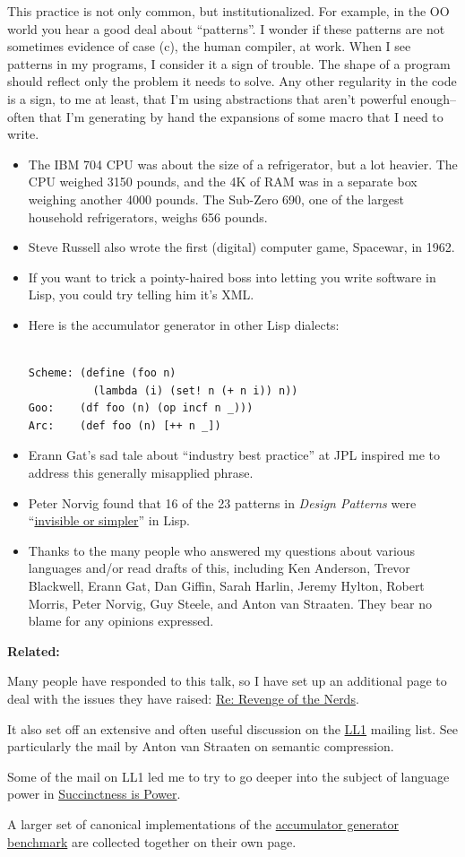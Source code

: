 This practice is not only common, but institutionalized. For example, in
the OO world you hear a good deal about ``patterns''. I wonder if these
patterns are not sometimes evidence of case (c), the human compiler, at
work. When I see patterns in my programs, I consider it a sign of
trouble. The shape of a program should reflect only the problem it needs
to solve. Any other regularity in the code is a sign, to me at least,
that I'm using abstractions that aren't powerful enough-- often that I'm
generating by hand the expansions of some macro that I need to write.


\begin{itemize}
\item
  The IBM 704 CPU was about the size of a refrigerator, but a lot
  heavier. The CPU weighed 3150 pounds, and the 4K of RAM was in a
  separate box weighing another 4000 pounds. The Sub-Zero 690, one of
  the largest household refrigerators, weighs 656 pounds.
\item
  Steve Russell also wrote the first (digital) computer game, Spacewar,
  in 1962.
\item
  If you want to trick a pointy-haired boss into letting you write
  software in Lisp, you could try telling him it's XML.
\item
  Here is the accumulator generator in other Lisp dialects:

\begin{verbatim}

Scheme: (define (foo n) 
          (lambda (i) (set! n (+ n i)) n))
Goo:    (df foo (n) (op incf n _)))
Arc:    (def foo (n) [++ n _])
\end{verbatim}
\item
  Erann Gat's sad tale about ``industry best practice'' at JPL inspired
  me to address this generally misapplied phrase.
\item
  Peter Norvig found that 16 of the 23 patterns in \emph{Design
  Patterns} were
  ``\href{http://www.norvig.com/design-patterns/}{invisible or
  simpler}'' in Lisp.
\item
  Thanks to the many people who answered my questions about various
  languages and/or read drafts of this, including Ken Anderson, Trevor
  Blackwell, Erann Gat, Dan Giffin, Sarah Harlin, Jeremy Hylton, Robert
  Morris, Peter Norvig, Guy Steele, and Anton van Straaten. They bear no
  blame for any opinions expressed.
\end{itemize}

\textbf{Related:}

Many people have responded to this talk, so I have set up an additional
page to deal with the issues they have raised: \href{icadmore.html}{Re:
Revenge of the Nerds}.

It also set off an extensive and often useful discussion on the
\href{http://www.ai.mit.edu/~gregs/ll1-discuss-archive-html/threads.html}{LL1}
mailing list. See particularly the mail by Anton van Straaten on
semantic compression.

Some of the mail on LL1 led me to try to go deeper into the subject of
language power in \href{power.html}{Succinctness is Power}.

A larger set of canonical implementations of the
\href{accgen.html}{accumulator generator benchmark} are collected
together on their own page.